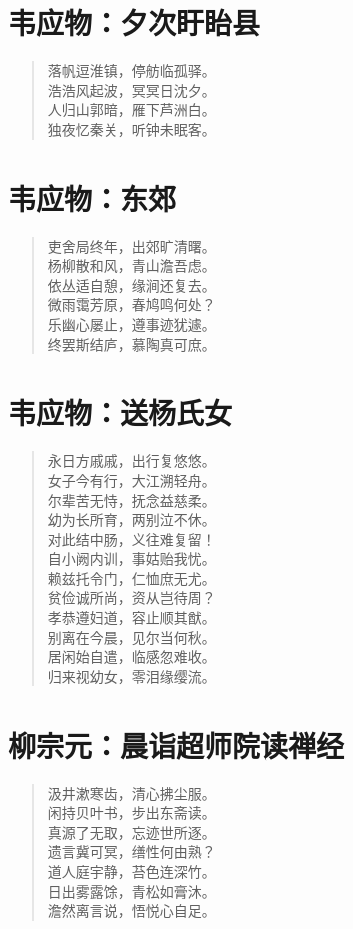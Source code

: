 \documentclass[12pt,oneside]{book}
\newenvironment{shici}{%
\begin{verse}\centering\yanti\large\hspace{12pt}}{\end{verse}}
\begin{document}
\begin{common-format}
\chapter{韦应物：夕次盱眙县}
\begin{shici}
落帆逗淮镇，停舫临孤驿。\\
浩浩风起波，冥冥日沈夕。\\
人归山郭暗，雁下芦洲白。\\
独夜忆秦关，听钟未眠客。
\end{shici}

\chapter{韦应物：东郊}
\begin{shici}
吏舍局终年，出郊旷清曙。\\
杨柳散和风，青山澹吾虑。\\
依丛适自憩，缘涧还复去。\\
微雨霭芳原，春鸠鸣何处？\\
乐幽心屡止，遵事迹犹遽。\\
终罢斯结庐，慕陶真可庶。
\end{shici}

\chapter{韦应物：送杨氏女}
\begin{shici}
永日方戚戚，出行复悠悠。\\
女子今有行，大江溯轻舟。\\
尔辈苦无恃，抚念益慈柔。\\
幼为长所育，两别泣不休。\\
对此结中肠，义往难复留！\\
自小阙内训，事姑贻我忧。\\
赖兹托令门，仁恤庶无尤。\\
贫俭诚所尚，资从岂待周？\\
孝恭遵妇道，容止顺其猷。\\
别离在今晨，见尔当何秋。\\
居闲始自遣，临感忽难收。\\
归来视幼女，零泪缘缨流。
\end{shici}

\chapter{柳宗元：晨诣超师院读禅经}
\begin{shici}
汲井漱寒齿，清心拂尘服。\\
闲持贝叶书，步出东斋读。\\
真源了无取，忘迹世所逐。\\
遗言冀可冥，缮性何由熟？\\
道人庭宇静，苔色连深竹。\\
日出雾露馀，青松如膏沐。\\
澹然离言说，悟悦心自足。
\end{shici}


\end{common-format}
\end{document}
